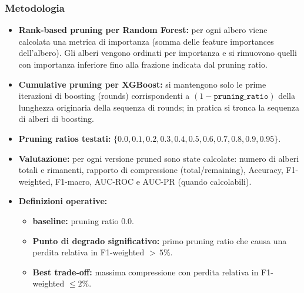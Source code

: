 \documentclass[a4paper,12pt]{report}
\begin{document}
	\subsubsection{Metodologia}
	\begin{itemize}
		\item \textbf{Rank-based pruning per Random Forest:} per ogni albero viene calcolata una metrica di importanza (somma delle feature importances dell'albero). Gli alberi vengono ordinati per importanza e si rimuovono quelli con importanza inferiore fino alla frazione indicata dal pruning ratio.
		\item \textbf{Cumulative pruning per XGBoost:} si mantengono solo le prime iterazioni di boosting (rounds) corrispondenti a \((1 - \texttt{pruning\_ratio})\) della lunghezza originaria della sequenza di rounds; in pratica si tronca la sequenza di alberi di boosting.
		\item \textbf{Pruning ratios testati:} \(\{0.0,0.1,0.2,0.3,0.4,0.5,0.6,0.7,0.8,0.9,0.95\}\).
		\item \textbf{Valutazione:} per ogni versione pruned sono state calcolate: numero di alberi totali e rimanenti, rapporto di compressione (total/remaining), Accuracy, F1-weighted, F1-macro, AUC-ROC e AUC-PR (quando calcolabili).
		\item \textbf{Definizioni operative:}
		\begin{itemize}
			\item \textbf{baseline:} pruning ratio 0.0.
			\item \textbf{Punto di degrado significativo:} primo pruning ratio che causa una perdita relativa in F1-weighted \(>\,5\%\).
			\item \textbf{Best trade-off:} massima compressione con perdita relativa in F1-weighted \(\leq 2\%\).
		\end{itemize}
	\end{itemize}
	
\end{document}
